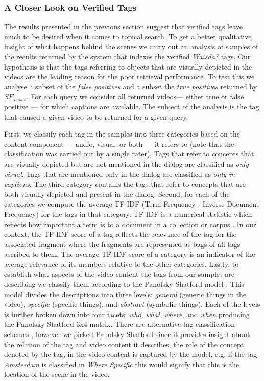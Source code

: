 \subsubsection{A Closer Look on Verified Tags}\label{topicir:qual-ana}
The results presented in the previous section suggest that verified tags leave much to be desired when it comes to topical search. To get a better qualitative insight of what happens behind the scenes we carry out an analysis of samples of the results returned by the system that indexes the verified \textit{Waisda?} tags. Our hypothesis is that the tags referring to objects that are visually depicted in the videos are the leading reason for the poor retrieval performance. To test this we analyse a subset of the \textit{false positives} and a subset the \textit{true positives} returned by $SE_{vuser}$. For each query we consider all returned videos--- either true or false positive --- for which captions are available. The subject of the analysis is the tag that caused a given video to be returned for a given query.

First, we classify each tag in the samples into three categories based on the content component --- audio, visual, or both --- it refers to (note that the classification was carried out by a single rater). Tags that refer to concepts that are visually depicted but are not mentioned in the dialog are classified as \textit{only visual}. Tags that are mentioned only in the dialog are classified as \textit{only in captions}. The third category contains the tags that refer to concepts that are both visually depicted and present in the dialog. Second, for each of the categories we compute the average TF-IDF (Term Frequency - Inverse Document Frequency) for the tags in that category. TF-IDF is a numerical statistic which reflects how important a term is to a document in a collection or corpus \cite{tfidf1,tfidf2}. In our context, the TF-IDF score of a tag reflects the relevance of the tag for the associated fragment where the fragments are represented as bags of all tags ascribed to them.  The average TF-IDF score of a category is an indicator of the average relevance of its members relative to the other categories. Lastly, to establish what aspects of the video content the tags from our samples are describing we classify them according to the Panofsky-Shatford model \cite{laurapaper}. This model divides the descriptions into three levels: \textit{general} (generic things in the video), \textit{specific} (specific things), and \textit{abstract} (symbolic things). Each of the levels is further broken down into four facets: \textit{who}, \textit{what}, \textit{where}, and
\textit{when} producing the Panofsky-Shatford 3x4 matrix. There are alternative tag classification schemes \cite{Sigurbjornsson:2008:FTR:1367497.1367542}, however we picked Panofsky-Shatford since it provides insight about the relation of the tag and video content it describes; the role of the concept, denoted by the tag, in the video content is captured by the model, e.g. if the tag \textit{Amsterdam} is classified in \textit{Where Specific} this would signify that this is the location of the scene in the video.

